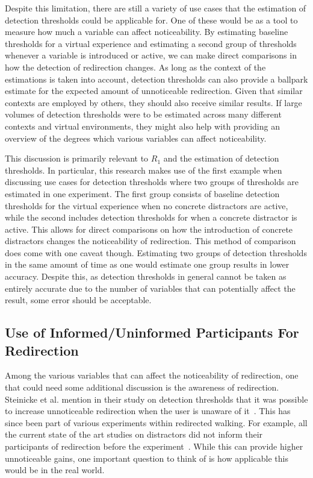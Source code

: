 Despite this limitation, there are still a variety of use cases that the estimation of detection thresholds could be applicable for. One of these would be as a tool to measure how much a variable can affect noticeability. By estimating baseline thresholds for a virtual experience and estimating a second group of thresholds whenever a variable is introduced or active, we can make direct comparisons in how the detection of redirection changes. As long as the context of the estimations is taken into account, detection thresholds can also provide a ballpark estimate for the expected amount of unnoticeable redirection. Given that similar contexts are employed by others, they should also receive similar results. If large volumes of detection thresholds were to be estimated across many different contexts and virtual environments, they might also help with providing an overview of the degrees which various variables can affect noticeability. 

This discussion is primarily relevant to $R_1$ and the estimation of detection thresholds. In particular, this research makes use of the first example when discussing use cases for detection thresholds where two groups of thresholds are estimated in one experiment. The first group consists of baseline detection thresholds for the virtual experience when no concrete distractors are active, while the second includes detection thresholds for when a concrete distractor is active. This allows for direct comparisons on how the introduction of concrete distractors changes the noticeability of redirection. This method of comparison does come with one caveat though. Estimating two groups of detection thresholds in the same amount of time as one would estimate one group results in lower accuracy. Despite this, as detection thresholds in general cannot be taken as entirely accurate due to the number of variables that can potentially affect the result, some error should be acceptable. 

\subsection{Use of Informed/Uninformed Participants For Redirection}
Among the various variables that can affect the noticeability of redirection, one that could need some additional discussion is the awareness of redirection. Steinicke et al. mention in their study on detection thresholds that it was possible to increase unnoticeable redirection when the user is unaware of it~\cite{5072212}. This has since been part of various experiments within redirected walking. For example, all the current state of the art studies on distractors did not inform their participants of redirection before the experiment~\cite{sra2018vmotion, chen2017towards, chen2017supporting}. While this can provide higher unnoticeable gains, one important question to think of is how applicable this would be in the real world. 

